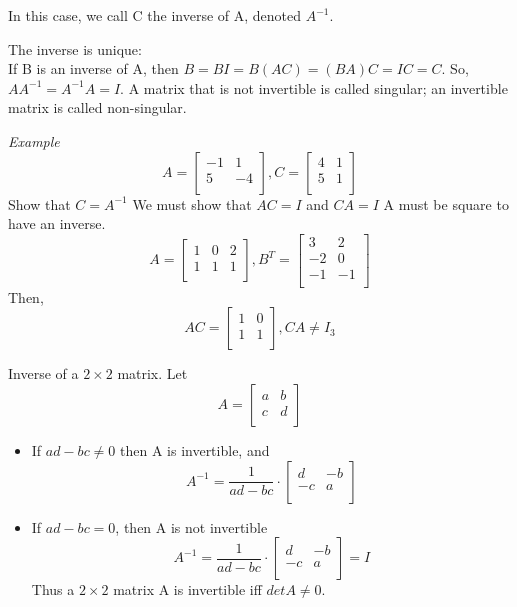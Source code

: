\documentclass{article}
\begin{document}
In this case, we call C the inverse of A, denoted $A^{-1}$.

The inverse is unique:\\
If B is an inverse of A, then $B=BI=B(AC)=(BA)C=IC=C$. So,
$AA^{-1}=A^{-1}A=I$. A matrix that is not invertible is called
singular; an invertible matrix is called non-singular.

\emph{Example}
\[ A=\left[ \begin{array}{cc}
                -1 & 1 \\
                5 & -4 \\
             \end{array} \right],
   C=\left[ \begin{array}{cc}
                4 & 1 \\
                5 & 1 \\
             \end{array} \right]
\]
Show that $C=A^{-1}$ We must show that $AC=I$ and $CA=I$ A must be
square to have an inverse.
\[ A=\left[ \begin{array}{ccc}
                1 & 0 & 2 \\
                1 & 1 & 1 \\
             \end{array} \right],
   B^T=\left[ \begin{array}{cc}
                3 & 2 \\
                -2 & 0 \\
                -1 & -1 \\
             \end{array} \right]
\]
Then,
\[ AC=\left[ \begin{array}{cc}
                1 & 0 \\
                1 & 1 \\
             \end{array} \right], CA \not= I_3
\]

Inverse of a $2{\times}2$ matrix.
Let \[ A=\left[ \begin{array}{cc}
                a & b \\
                c & d \\
             \end{array} \right]
\]
\begin{itemize}
\item If $ad-bc\not=0$ then A is invertible, and
\[ A^{-1}=\frac{1}{ad-bc}\cdot
\left[ \begin{array}{cc}
                d & -b \\
                -c & a \\
       \end{array} \right]
\]
\item If $ad-bc=0$, then A is not invertible
\[ A^{-1}=\frac{1}{ad-bc}\cdot
\left[ \begin{array}{cc}
                d & -b \\
                -c & a \\
       \end{array} \right]
       =I
\]
Thus a $2{\times}2$ matrix A is invertible iff $detA\not=0$.
\end{itemize}
\end{document}
